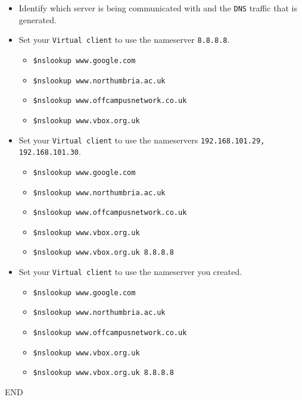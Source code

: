 \documentclass[11pt]{article}
\begin{document}
\begin{enumerate}
\begin{tcolorbox}[colback=blue!20]
\begin{itemize}
                \item Identify which server is being communicated with and the \texttt{DNS} traffic that is generated. 
            \end{itemize}
        \end{tcolorbox}
        \begin{itemize}
            \item Set your \texttt{Virtual client} to use the nameserver \texttt{8.8.8.8}.
                \begin{itemize}
                    \item \texttt{\$nslookup www.google.com}
                    \item \texttt{\$nslookup www.northumbria.ac.uk}
                    \item \texttt{\$nslookup www.offcampusnetwork.co.uk}
                    \item \texttt{\$nslookup www.vbox.org.uk}
                \end{itemize} 
            \item Set your \texttt{Virtual client} to use the nameservers \texttt{192.168.101.29, 192.168.101.30}.
                \begin{itemize}
                    \item \texttt{\$nslookup www.google.com}
                    \item \texttt{\$nslookup www.northumbria.ac.uk}
                    \item \texttt{\$nslookup www.offcampusnetwork.co.uk}
                    \item \texttt{\$nslookup www.vbox.org.uk}
                    \item \texttt{\$nslookup www.vbox.org.uk 8.8.8.8}
                \end{itemize} 
            \item Set your \texttt{Virtual client} to use the nameserver you created.
                \begin{itemize}
                    \item \texttt{\$nslookup www.google.com}
                    \item \texttt{\$nslookup www.northumbria.ac.uk}
                    \item \texttt{\$nslookup www.offcampusnetwork.co.uk}
                    \item \texttt{\$nslookup www.vbox.org.uk}
                    \item \texttt{\$nslookup www.vbox.org.uk 8.8.8.8}
                \end{itemize} 
        \end{itemize}
    \end{enumerate}
END    
\end{document}
